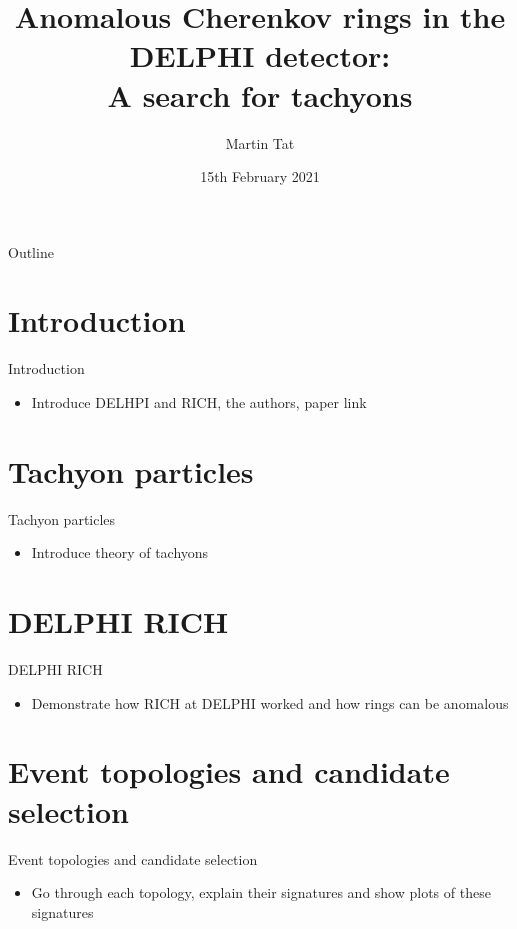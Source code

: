 \documentclass{beamer}
\title[Graduate Symposium]{Anomalous Cherenkov rings in the DELPHI detector:\\A search for tachyons}
\author{Martin Tat}
\institute{University of Oxford}
\date{15th February 2021}
\begin{document}
\begin{frame}
  \titlepage
\end{frame}

\begin{frame}{Outline}
  \tableofcontents
\end{frame}

\section{Introduction}
\begin{frame}{Introduction}
  \begin{itemize}
    \item{Introduce DELHPI and RICH, the authors, paper link}
  \end{itemize}
\end{frame}

\section{Tachyon particles}
\begin{frame}{Tachyon particles}
  \begin{itemize}
    \item{Introduce theory of tachyons}
  \end{itemize}
\end{frame}

\section{DELPHI RICH}
\begin{frame}{DELPHI RICH}
  \begin{itemize}
    \item{Demonstrate how RICH at DELPHI worked and how rings can be anomalous}
  \end{itemize}
\end{frame}

\section{Event topologies and candidate selection}
\begin{frame}{Event topologies and candidate selection}
  \begin{itemize}
    \item{Go through each topology, explain their signatures and show plots of these signatures}
  \end{itemize}
\end{frame}
\end{document}
